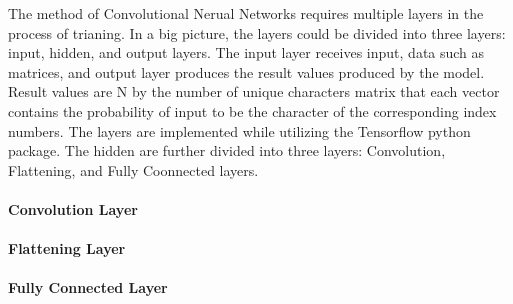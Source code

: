 The method of Convolutional Nerual Networks requires multiple layers in the process of trianing.
In a big picture, the layers could be divided into three layers: input, hidden, and output layers.
The input layer receives input, data such as matrices, and output layer produces the result values produced
by the model. Result values are N by the number of unique characters matrix that each vector contains the
probability of input to be the character of the corresponding index numbers. The layers are implemented while
utilizing the Tensorflow python package.
\newline
\newline
\indent
The hidden are further divided into three layers: Convolution, Flattening, and Fully Coonnected layers.

\paragraph{Convolution Layer}

\paragraph{Flattening Layer}

\paragraph{Fully Connected Layer}
